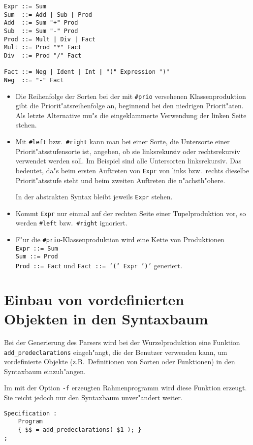 
\begin{verbatim}
Expr ::= Sum
Sum  ::= Add | Sub | Prod
Add  ::= Sum "+" Prod
Sub  ::= Sum "-" Prod
Prod ::= Mult | Div | Fact
Mult ::= Prod "*" Fact
Div  ::= Prod "/" Fact

Fact ::= Neg | Ident | Int | "(" Expression ")"
Neg  ::= "-" Fact
\end{verbatim}



\begin{itemize}
\item
Die Reihenfolge der Sorten bei der mit {\tt \#prio} versehenen Klassenproduktion
gibt die Priorit"atsreihenfolge an, beginnend bei den niedrigen Priorit"aten.
Als letzte Alternative mu"s die eingeklammerte Verwendung der linken Seite stehen.

\item
Mit {\tt \#left} bzw.\ {\tt \#right} kann man bei einer Sorte, die Untersorte einer
Priorit"atsstufensorte ist, angeben, ob sie linksrekursiv oder rechtsrekursiv verwendet
werden soll. Im Beispiel sind alle Untersorten linksrekursiv.
Das bedeutet, da"s beim ersten Auftreten von {\tt Expr} von links bzw.\ rechts
dieselbe Priorit"atsstufe steht und beim zweiten Auftreten die n"achsth"ohere.

In der abstrakten Syntax bleibt jeweils {\tt Expr} stehen.

\item Kommt {\tt Expr} nur einmal auf der rechten Seite einer Tupelproduktion
vor, so werden {\tt \#left} bzw.\ {\tt \#right} ignoriert.

\item
F"ur die {\tt \#prio}-Klassenproduktion wird eine Kette von Produktionen\\
{\tt Expr ::= Sum}\\ {\tt Sum ::= Prod}\\ {\tt Prod ::= Fact} \quad und \quad
{\tt Fact ::= '(' Expr ')'} \quad generiert.


\end{itemize}

\section{Einbau von vordefinierten Objekten in den Syntaxbaum}

Bei der Generierung des Parsers wird bei der Wurzelproduktion eine Funktion
{\tt add\_predeclarations} eingeh"angt, die der Benutzer verwenden kann, um
vordefinierte Objekte (z.B.\ Definitionen von Sorten oder Funktionen)
in den Syntaxbaum einzuh"angen.

Im mit der Option {\tt -f} erzeugten Rahmenprogramm wird diese Funktion
erzeugt. Sie reicht jedoch nur den Syntaxbaum unver"andert weiter.

\medskip{}

\begin{verbatim}
Specification :
	Program
	{ $$ = add_predeclarations( $1 ); }
;
\end{verbatim}



